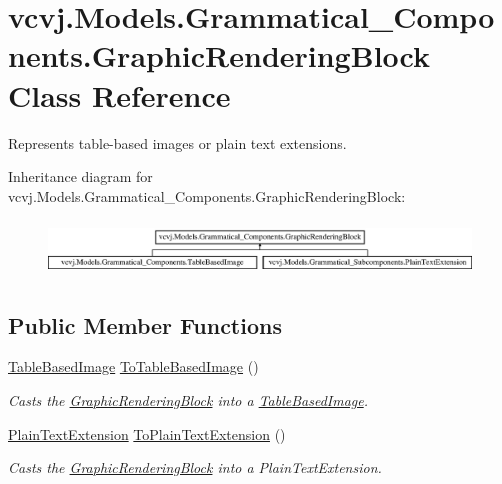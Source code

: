 \hypertarget{classvcvj_1_1_models_1_1_grammatical___components_1_1_graphic_rendering_block}{}\section{vcvj.\+Models.\+Grammatical\+\_\+\+Components.\+Graphic\+Rendering\+Block Class Reference}
\label{classvcvj_1_1_models_1_1_grammatical___components_1_1_graphic_rendering_block}


Represents table-\/based images or plain text extensions.  


Inheritance diagram for vcvj.\+Models.\+Grammatical\+\_\+\+Components.\+Graphic\+Rendering\+Block\+:\begin{figure}[H]
\begin{center}
\leavevmode
\includegraphics[height=1.489362cm]{classvcvj_1_1_models_1_1_grammatical___components_1_1_graphic_rendering_block}
\end{center}
\end{figure}
\subsection*{Public Member Functions}
\begin{DoxyCompactItemize}
\item 
\hyperlink{classvcvj_1_1_models_1_1_grammatical___components_1_1_table_based_image}{Table\+Based\+Image} \hyperlink{classvcvj_1_1_models_1_1_grammatical___components_1_1_graphic_rendering_block_a0373c25b75cc4d867d3e0cf3155046c8}{To\+Table\+Based\+Image} ()
\begin{DoxyCompactList}\small\item\em Casts the \hyperlink{classvcvj_1_1_models_1_1_grammatical___components_1_1_graphic_rendering_block}{Graphic\+Rendering\+Block} into a \hyperlink{classvcvj_1_1_models_1_1_grammatical___components_1_1_table_based_image}{Table\+Based\+Image}. \end{DoxyCompactList}\item 
\hyperlink{classvcvj_1_1_models_1_1_grammatical___subcomponents_1_1_plain_text_extension}{Plain\+Text\+Extension} \hyperlink{classvcvj_1_1_models_1_1_grammatical___components_1_1_graphic_rendering_block_aeb72aff7c9a375cf9c63f7465596dea6}{To\+Plain\+Text\+Extension} ()
\begin{DoxyCompactList}\small\item\em Casts the \hyperlink{classvcvj_1_1_models_1_1_grammatical___components_1_1_graphic_rendering_block}{Graphic\+Rendering\+Block} into a Plain\+Text\+Extension. \end{DoxyCompactList}\end{DoxyCompactItemize}
